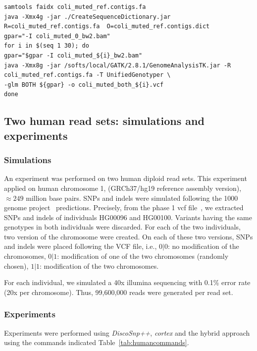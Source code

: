 \documentclass{bmcart}
\newcommand{\discopp}{{\it DiscoSnp++}\xspace}
\newcommand{\co}{{\it cortex}\xspace}
\begin{document}
\begin{table}[ht]
\begin{verbatim}
samtools faidx coli_muted_ref.contigs.fa
java -Xmx4g -jar ./CreateSequenceDictionary.jar  R=coli_muted_ref.contigs.fa  O=coli_muted_ref.contigs.dict
gpar="-I coli_muted_0_bw2.bam"
for i in $(seq 1 30); do
gpar="$gpar -I coli_muted_${i}_bw2.bam"
java -Xmx8g -jar /softs/local/GATK/2.8.1/GenomeAnalysisTK.jar -R coli_muted_ref.contigs.fa -T UnifiedGenotyper \
-glm BOTH ${gpar} -o coli_muted_both_${i}.vcf
done

	\end{verbatim}	\normalsize
	\caption{Commands used for calling SNPs and indels from 2 to 30 E. Coli read sets ({coli\_muted\_n\_30\_genome\_$i$\_reads.fasta} for $i$ in $[1,30]$) with \discopp, \co or the hybrid approach. \label{tab:colicommands}}
\end{table}




\subsection*{Two human read sets: simulations and experiments}
\subsubsection*{Simulations}
An experiment was performed on two human diploid read sets. This experiment applied on human chromosome 1, (GRCh37/hg19 reference assembly version), $\approx249$ million base pairs. SNPs and indels were simulated following the 1000 genome project~\cite{Altshuler2012} predictions. Precisely, from the phase 1 vcf file~\cite{vcf}, we extracted SNPs and indels of individuals HG00096 and HG00100. Variants having the same genotypes in both individuals were discarded. For each of the two individuals, two version of the chromosome were created. On each of these two versions, SNPs and indels were placed following the VCF file, i.e., $0|0$: no modification of the chromosomes, $0|1$: modification of one of the two chromosomes (randomly chosen), $1|1$: modification of the two chromosomes. 

For each individual, we simulated a 40x illumina sequencing with 0.1\% error rate (20x per chromosome). Thus, 99,600,000 reads were generated per read set. 

\subsubsection*{Experiments}
Experiments were performed using \discopp, \co and the hybrid approach using the commands indicated Table~\ref{tab:humancommands}.
\end{document}

